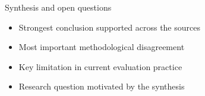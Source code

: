 \begin{frame}{Synthesis and open questions}
  \begin{itemize}
    \item Strongest conclusion supported across the sources
    \item Most important methodological disagreement
    \item Key limitation in current evaluation practice
    \item Research question motivated by the synthesis
  \end{itemize}
\end{frame}

